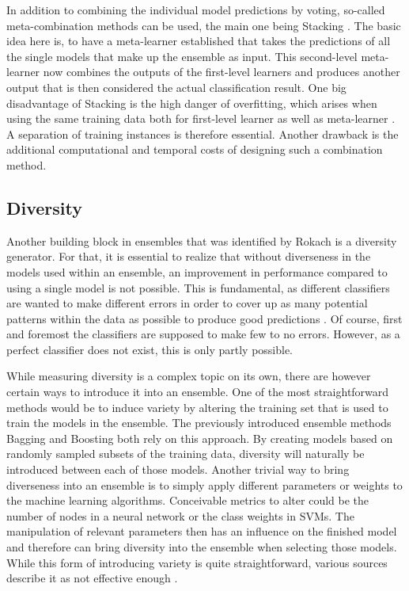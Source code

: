 In addition to combining the individual model predictions by voting, so-called meta-combination methods can be used, the main one being Stacking \cite{rokach2010}. The basic idea here is, to have a meta-learner established that takes the predictions of all the single models that make up the ensemble as input. This second-level meta-learner now combines the outputs of the first-level learners and produces another output that is then considered the actual classification result. One big disadvantage of Stacking is the high danger of overfitting, which arises when using the same training data both for first-level learner as well as meta-learner \cite{zhou2012}. A separation of training instances is therefore essential. Another drawback is the additional computational and temporal costs of designing such a combination method.



\subsection{Diversity}

Another building block in ensembles that was identified by Rokach \cite{rokach2010} is a diversity generator. For that, it is essential to realize that without diverseness in the models used within an ensemble, an improvement in performance compared to using a single model is not possible. This is fundamental, as different classifiers are wanted to make different errors in order to cover up as many potential patterns within the data as possible to produce good predictions \cite{kuncheva2004}. Of course, first and foremost the classifiers are supposed to make few to no errors. However, as a perfect classifier does not exist, this is only partly possible. 

While measuring diversity is a complex topic on its own, there are however certain ways to introduce it into an ensemble. One of the most straightforward methods would be to induce variety by altering the training set that is used to train the models in the ensemble. The previously introduced ensemble methods Bagging and Boosting both rely on this approach. By creating models based on randomly sampled subsets of the training data, diversity will naturally be introduced between each of those models. Another trivial way to bring diverseness into an ensemble is to simply apply different parameters or weights to the machine learning algorithms. Conceivable metrics to alter could be the number of nodes in a neural network or the class weights in SVMs. The manipulation of relevant parameters then has an influence on the finished model and therefore can bring diversity into the ensemble when selecting those models. While this form of introducing variety is quite straightforward, various sources describe it as not effective enough \cite{brown2005}.

